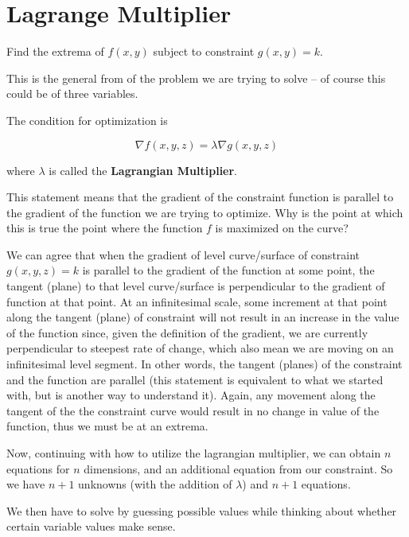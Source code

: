 \section{Lagrange Multiplier}

\begin{example}
	Find the extrema of $f(x, y)$ subject to constraint $g(x, y) = k$.
\end{example}

This is the general from of the problem we are trying to solve -- of course this could be of three variables.

The condition for optimization is

\begin{equation}
	\nabla f(x, y, z) = \lambda \nabla g(x, y, z)
\end{equation}

where $\lambda$ is called the \textbf{Lagrangian Multiplier}.

\begin{remark}
	This statement means that the gradient of the constraint function is parallel to the gradient of the function we are trying to optimize. Why is the point at which this is true the point where the function $f$ is maximized on the curve?

	We can agree that when the gradient of level curve/surface of constraint $g(x, y, z) = k$ is parallel to the gradient of the function at some point, the tangent (plane) to that level curve/surface is perpendicular to the gradient of function at that point. At an infinitesimal scale, some increment at that point along the tangent (plane) of constraint will not result in an increase in the value of the function since, given the definition of the gradient, we are currently perpendicular to steepest rate of change, which also mean we are moving on an infinitesimal level segment. In other words, the tangent (planes) of the constraint and the function are parallel (this statement is equivalent to what we started with, but is another way to understand it). Again, any movement along the tangent of the the constraint curve would result in no change in value of the function, thus we must be at an extrema.
\end{remark}

Now, continuing with how to utilize the lagrangian multiplier, we can obtain $n$ equations for $n$ dimensions, and an additional equation from our constraint. So we have $n + 1$ unknowns (with the addition of $\lambda$) and $n + 1$ equations.

We then have to solve by guessing possible values while thinking about whether certain variable values make sense.
